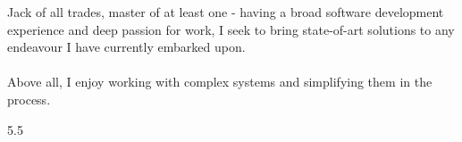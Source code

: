 \documentclass[9pt]{style/developercv}
\begin{document}
\begin{minipage}[t]{0.4\textwidth} %
    \vspace{-\baselineskip} %
    
    Jack of all trades, master of at least one - having a broad software development experience 
    and deep passion for work, I seek to bring state-of-art solutions to any endeavour
    I have currently embarked upon. \\ \\
    Above all, I enjoy working with complex systems and simplifying them in the process.

\end{minipage}
\hfill %
\begin{minipage}[t]{0.5\textwidth} %
    \vspace{-\baselineskip} %
    \begin{barchart}{5.5}
    \end{barchart}
\end{minipage}

\vspace{1cm}

\end{document}
